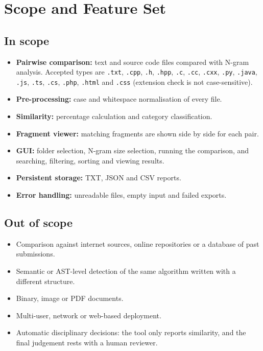 \documentclass[11pt,a4paper]{report}
\newcommand{\cc}[1]{\texttt{#1}}
\begin{document}
\section{Scope and Feature Set}

\subsection{In scope}
\begin{itemize}[nosep]
  \item \textbf{Pairwise comparison:} text and source code files compared with N-gram
        analysis. Accepted types are \cc{.txt}, \cc{.cpp}, \cc{.h}, \cc{.hpp}, \cc{.c},
        \cc{.cc}, \cc{.cxx}, \cc{.py}, \cc{.java}, \cc{.js}, \cc{.ts}, \cc{.cs}, \cc{.php},
        \cc{.html} and \cc{.css} (extension check is not case-sensitive).
  \item \textbf{Pre-processing:} case and whitespace normalisation of every file.
  \item \textbf{Similarity:} percentage calculation and category classification.
  \item \textbf{Fragment viewer:} matching fragments are shown side by side for each pair.
  \item \textbf{GUI:} folder selection, N-gram size selection, running the comparison, and
        searching, filtering, sorting and viewing results.
  \item \textbf{Persistent storage:} TXT, JSON and CSV reports.
  \item \textbf{Error handling:} unreadable files, empty input and failed exports.
\end{itemize}

\subsection{Out of scope}
\begin{itemize}[nosep]
  \item Comparison against internet sources, online repositories or a database of past
        submissions.
  \item Semantic or AST-level detection of the same algorithm written with a different
        structure.
  \item Binary, image or PDF documents.
  \item Multi-user, network or web-based deployment.
  \item Automatic disciplinary decisions: the tool only reports similarity, and the final
        judgement rests with a human reviewer.
\end{itemize}
\end{document}
